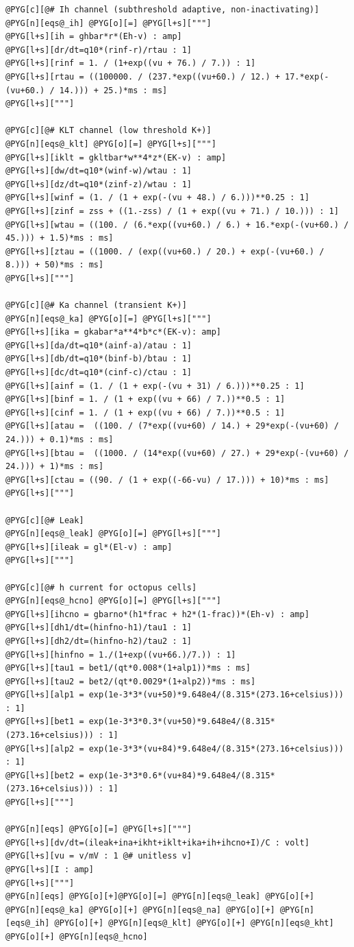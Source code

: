\documentclass[letterpaper,10pt,english]{manual}
\begin{document}
\begin{Verbatim}[commandchars=@\[\]]
@PYG[c][@# Ih channel (subthreshold adaptive, non-inactivating)]
@PYG[n][eqs@_ih] @PYG[o][=] @PYG[l+s]["""]
@PYG[l+s][ih = ghbar*r*(Eh-v) : amp]
@PYG[l+s][dr/dt=q10*(rinf-r)/rtau : 1]
@PYG[l+s][rinf = 1. / (1+exp((vu + 76.) / 7.)) : 1]
@PYG[l+s][rtau = ((100000. / (237.*exp((vu+60.) / 12.) + 17.*exp(-(vu+60.) / 14.))) + 25.)*ms : ms]
@PYG[l+s]["""]

@PYG[c][@# KLT channel (low threshold K+)]
@PYG[n][eqs@_klt] @PYG[o][=] @PYG[l+s]["""]
@PYG[l+s][iklt = gkltbar*w**4*z*(EK-v) : amp]
@PYG[l+s][dw/dt=q10*(winf-w)/wtau : 1]
@PYG[l+s][dz/dt=q10*(zinf-z)/wtau : 1]
@PYG[l+s][winf = (1. / (1 + exp(-(vu + 48.) / 6.)))**0.25 : 1]
@PYG[l+s][zinf = zss + ((1.-zss) / (1 + exp((vu + 71.) / 10.))) : 1]
@PYG[l+s][wtau = ((100. / (6.*exp((vu+60.) / 6.) + 16.*exp(-(vu+60.) / 45.))) + 1.5)*ms : ms]
@PYG[l+s][ztau = ((1000. / (exp((vu+60.) / 20.) + exp(-(vu+60.) / 8.))) + 50)*ms : ms]
@PYG[l+s]["""]

@PYG[c][@# Ka channel (transient K+)]
@PYG[n][eqs@_ka] @PYG[o][=] @PYG[l+s]["""]
@PYG[l+s][ika = gkabar*a**4*b*c*(EK-v): amp]
@PYG[l+s][da/dt=q10*(ainf-a)/atau : 1]
@PYG[l+s][db/dt=q10*(binf-b)/btau : 1]
@PYG[l+s][dc/dt=q10*(cinf-c)/ctau : 1]
@PYG[l+s][ainf = (1. / (1 + exp(-(vu + 31) / 6.)))**0.25 : 1]
@PYG[l+s][binf = 1. / (1 + exp((vu + 66) / 7.))**0.5 : 1]
@PYG[l+s][cinf = 1. / (1 + exp((vu + 66) / 7.))**0.5 : 1]
@PYG[l+s][atau =  ((100. / (7*exp((vu+60) / 14.) + 29*exp(-(vu+60) / 24.))) + 0.1)*ms : ms]
@PYG[l+s][btau =  ((1000. / (14*exp((vu+60) / 27.) + 29*exp(-(vu+60) / 24.))) + 1)*ms : ms]
@PYG[l+s][ctau = ((90. / (1 + exp((-66-vu) / 17.))) + 10)*ms : ms]
@PYG[l+s]["""]

@PYG[c][@# Leak]
@PYG[n][eqs@_leak] @PYG[o][=] @PYG[l+s]["""]
@PYG[l+s][ileak = gl*(El-v) : amp]
@PYG[l+s]["""]

@PYG[c][@# h current for octopus cells]
@PYG[n][eqs@_hcno] @PYG[o][=] @PYG[l+s]["""]
@PYG[l+s][ihcno = gbarno*(h1*frac + h2*(1-frac))*(Eh-v) : amp]
@PYG[l+s][dh1/dt=(hinfno-h1)/tau1 : 1]
@PYG[l+s][dh2/dt=(hinfno-h2)/tau2 : 1]
@PYG[l+s][hinfno = 1./(1+exp((vu+66.)/7.)) : 1]
@PYG[l+s][tau1 = bet1/(qt*0.008*(1+alp1))*ms : ms]
@PYG[l+s][tau2 = bet2/(qt*0.0029*(1+alp2))*ms : ms]
@PYG[l+s][alp1 = exp(1e-3*3*(vu+50)*9.648e4/(8.315*(273.16+celsius))) : 1]
@PYG[l+s][bet1 = exp(1e-3*3*0.3*(vu+50)*9.648e4/(8.315*(273.16+celsius))) : 1]
@PYG[l+s][alp2 = exp(1e-3*3*(vu+84)*9.648e4/(8.315*(273.16+celsius))) : 1]
@PYG[l+s][bet2 = exp(1e-3*3*0.6*(vu+84)*9.648e4/(8.315*(273.16+celsius))) : 1]
@PYG[l+s]["""]

@PYG[n][eqs] @PYG[o][=] @PYG[l+s]["""]
@PYG[l+s][dv/dt=(ileak+ina+ikht+iklt+ika+ih+ihcno+I)/C : volt]
@PYG[l+s][vu = v/mV : 1 @# unitless v]
@PYG[l+s][I : amp]
@PYG[l+s]["""]
@PYG[n][eqs] @PYG[o][+]@PYG[o][=] @PYG[n][eqs@_leak] @PYG[o][+] @PYG[n][eqs@_ka] @PYG[o][+] @PYG[n][eqs@_na] @PYG[o][+] @PYG[n][eqs@_ih] @PYG[o][+] @PYG[n][eqs@_klt] @PYG[o][+] @PYG[n][eqs@_kht] @PYG[o][+] @PYG[n][eqs@_hcno]


\end{Verbatim}
\end{document}
